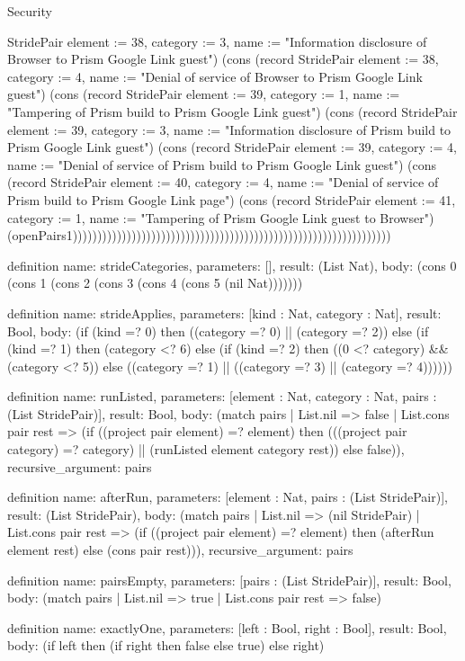 \begin{lexlean}{Security}
\begin{semanticmodule}
{StridePair {element := 38, category := 3, name := "Information disclosure of Browser to Prism Google Link guest"}) (cons (record StridePair {element := 38, category := 4, name := "Denial of service of Browser to Prism Google Link guest"}) (cons (record StridePair {element := 39, category := 1, name := "Tampering of Prism build to Prism Google Link guest"}) (cons (record StridePair {element := 39, category := 3, name := "Information disclosure of Prism build to Prism Google Link guest"}) (cons (record StridePair {element := 39, category := 4, name := "Denial of service of Prism build to Prism Google Link guest"}) (cons (record StridePair {element := 40, category := 4, name := "Denial of service of Prism build to Prism Google Link page"}) (cons (record StridePair {element := 41, category := 1, name := "Tampering of Prism Google Link guest to Browser"}) (openPairs1)))))))))))))))))))))))))))))))))))))))))))))))))))))))))))))))))
}

definition{
  name: strideCategories,
  parameters: [],
  result: (List Nat),
  body: (cons 0 (cons 1 (cons 2 (cons 3 (cons 4 (cons 5 (nil Nat)))))))
}

definition{
  name: strideApplies,
  parameters: [kind : Nat, category : Nat],
  result: Bool,
  body: (if (kind =? 0) then ((category =? 0) || (category =? 2)) else (if (kind =? 1) then (category <? 6) else (if (kind =? 2) then ((0 <? category) && (category <? 5)) else ((category =? 1) || ((category =? 3) || (category =? 4))))))
}

definition{
  name: runListed,
  parameters: [element : Nat, category : Nat, pairs : (List StridePair)],
  result: Bool,
  body: (match pairs
    | List.nil => false
    | List.cons pair rest => (if ((project pair element) =? element) then (((project pair category) =? category) || (runListed element category rest)) else false)),
  recursive_argument: pairs
}

definition{
  name: afterRun,
  parameters: [element : Nat, pairs : (List StridePair)],
  result: (List StridePair),
  body: (match pairs
    | List.nil => (nil StridePair)
    | List.cons pair rest => (if ((project pair element) =? element) then (afterRun element rest) else (cons pair rest))),
  recursive_argument: pairs
}

definition{
  name: pairsEmpty,
  parameters: [pairs : (List StridePair)],
  result: Bool,
  body: (match pairs | List.nil => true | List.cons pair rest => false)
}

definition{
  name: exactlyOne,
  parameters: [left : Bool, right : Bool],
  result: Bool,
  body: (if left then (if right then false else true) else right)
}


\end{semanticmodule}
\end{lexlean}
